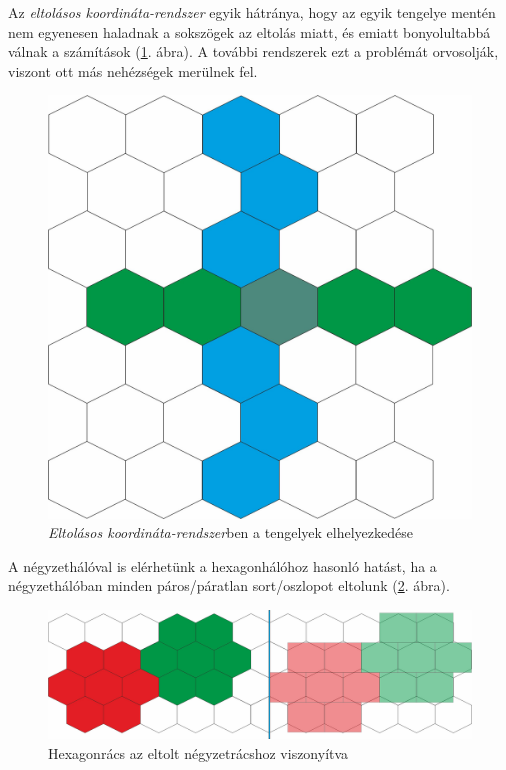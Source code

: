 Az \textit{eltolásos koordináta-rendszer} egyik hátránya, hogy az egyik tengelye mentén nem egyenesen haladnak a sokszögek az eltolás miatt, és emiatt bonyolultabbá válnak a számítások (\ref{fig:OffsetCoord}. ábra). A további rendszerek ezt a problémát orvosolják, viszont ott más nehézségek merülnek fel.	

\begin{figure}[h!]
\centering
\includegraphics[scale=0.3]{kepek/OffsetCoord.jpg}
\caption{\textit{Eltolásos koordináta-rendszer}ben a tengelyek elhelyezkedése}
\label{fig:OffsetCoord}
\end{figure}

\newpage
A négyzethálóval is elérhetünk a hexagonhálóhoz hasonló hatást, ha a négyzethálóban minden páros/páratlan sort/oszlopot eltolunk (\ref{fig:Hex_Sq}. ábra).

\begin{figure}[h!]
\centering
\includegraphics[scale=0.3]{kepek/Hex_Sq.jpg}
\caption{Hexagonrács az eltolt négyzetrácshoz viszonyítva}
\label{fig:Hex_Sq}
\end{figure}

